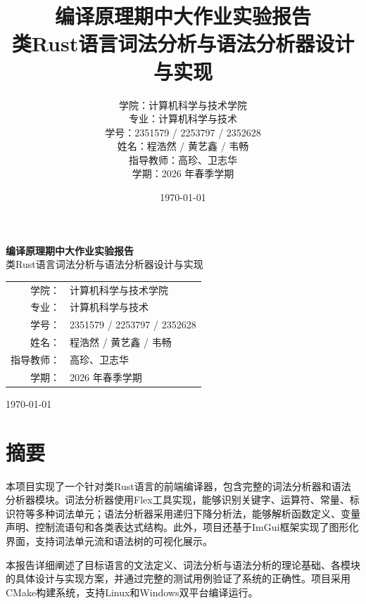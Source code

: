\documentclass[12pt,a4paper]{ctexart}
\title{\textbf{编译原理期中大作业实验报告}\\[0.5em]
\large 类Rust语言词法分析与语法分析器设计与实现}
\author{
    \begin{tabular}{rl}
        学院：& 计算机科学与技术学院 \\
        专业：& 计算机科学与技术 \\
        学号：& 2351579 / 2253797 / 2352628 \\
        姓名：& 程浩然 / 黄艺鑫 / 韦畅 \\
        指导教师：& 高珍、卫志华 \\
        学期：& 2026 年春季学期
    \end{tabular}
}
\date{\today}
\begin{document}
\begin{titlepage}
\centering
\vspace*{\fill}

{\LARGE\textbf{编译原理期中大作业实验报告}\\[1em]
\large 类Rust语言词法分析与语法分析器设计与实现}

\vspace{3em}

{\renewcommand{\arraystretch}{1.8}
\begin{tabular}{rl}
    学院：& 计算机科学与技术学院 \\
    专业：& 计算机科学与技术 \\
    学号：& 2351579 / 2253797 / 2352628 \\
    姓名：& 程浩然 / 黄艺鑫 / 韦畅 \\
    指导教师：& 高珍、卫志华 \\
    学期：& 2026 年春季学期
\end{tabular}
}

\vspace{2em}
{\today}

\vspace*{\fill}
\end{titlepage}

\tableofcontents
\newpage

\section*{摘要}

本项目实现了一个针对类Rust语言的前端编译器，包含完整的词法分析器和语法分析器模块。词法分析器使用Flex工具实现，能够识别关键字、运算符、常量、标识符等多种词法单元；语法分析器采用递归下降分析法，能够解析函数定义、变量声明、控制流语句和各类表达式结构。此外，项目还基于ImGui框架实现了图形化界面，支持词法单元流和语法树的可视化展示。

本报告详细阐述了目标语言的文法定义、词法分析与语法分析的理论基础、各模块的具体设计与实现方案，并通过完整的测试用例验证了系统的正确性。项目采用CMake构建系统，支持Linux和Windows双平台编译运行。
\end{document}
